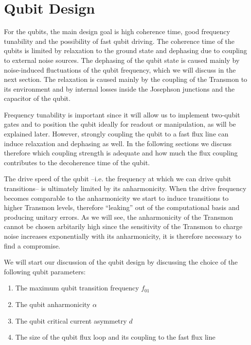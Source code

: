 \section{Qubit Design}

For the qubits, the main design goal is high coherence time, good frequency tunability and the possibility of fast qubit driving. The coherence time of the qubits is limited by relaxation to the ground state and dephasing due to coupling to external noise sources. The dephasing of the qubit state is caused mainly by noise-induced fluctuations of the qubit frequency, which we will discuss in the next section. The relaxation is caused mainly by the coupling of the Transmon to its environment and by internal losses inside the Josephson junctions and the capacitor of the qubit. 

Frequency tunability is important since it will allow us to implement two-qubit gates and to position the qubit ideally for readout or manipulation, as will be explained later. However, strongly coupling the qubit to a fast flux line can induce relaxation and dephasing as well. In the following sections we discuss therefore which coupling strength is adequate and how much the flux coupling contributes to the decoherence time of the qubit.

The drive speed of the qubit --i.e. the frequency at which we can drive qubit transitions-- is ultimately limited by its anharmonicity. When the drive frequency becomes comparable to the anharmonicity we start to induce transitions to higher Transmon levels, therefore ``leaking'' out of the computational basis and producing unitary errors. As we will see, the anharmonicity of the Transmon cannot be chosen arbitarily high since the sensitivity of the Transmon to charge noise increases exponentially with its anharmonicity, it is therefore necessary to find a compromise.

We will start our discussion of the qubit design by discussing the choice of the following qubit parameters:

\begin{enumerate}
\item The maximum qubit transition frequency $f_{01}$
\item The qubit anharmonicity $\alpha$
\item The qubit critical current asymmetry $d$
\item The size of the qubit flux loop and its coupling to the fast flux line
\end{enumerate}

